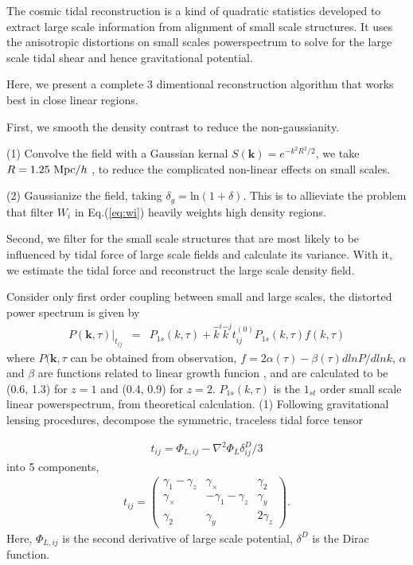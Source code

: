 The cosmic tidal reconstruction is a kind of quadratic statistics developed to extract large scale information from alignment of small scale structures.
It uses the anisotropic distortions on small scales powerspectrum to solve for the large scale tidal shear and hence gravitational potential.

Here, we present a complete 3 dimentional reconstruction algorithm that works best in close linear regions.

First, we smooth the density contrast to reduce the non-gaussianity.

(1) Convolve the field with a Gaussian kernal
$S(\bm{k})=e^{-k^2R^2/2}$, 
we take $R=1.25\ \mathrm{Mpc}/h$ \cite{2012:pen},
to reduce the complicated non-linear effects on small scales.

(2) Gaussianize the field, taking 
$\delta_g=\mathrm{ln}(1+\delta)$. 
This is to allieviate the problem that filter $W_i$ in Eq.(\ref{eq:wi}) heavily weights high density regions.


Second, we filter for the small scale structures that are most likely to be influenced by tidal force of large scale fields and calculate its variance. 
With it, we estimate the tidal force and reconstruct the large scale density field.

Consider only first order coupling between small and large scales,  
the distorted power spectrum \cite{2015:zhu} is given by
\begin{eqnarray}
\label{eq:powerdistort}
P(\bm{k},\tau)|_{t_{ij}}&=&P_{1s}(k,\tau)+
\hat{k}^i\hat{k}^jt_{ij}^{(0)}P_{1s}(k,\tau)f(k,\tau)
\end{eqnarray}
where $P(\bm{k},\tau$ can be obtained from observation, 
$f=2\alpha(\tau)-\beta(\tau)dlnP/dlnk$, 
$\alpha$ and $\beta$ are functions related to linear growth funcion \cite{2015:zhu}, 
and are calculated to be (0.6, 1.3) for $z=1$ and (0.4, 0.9) for $z=2$.
$P_{1s}(k,\tau)$ is the $1_{st}$ order small scale linear powerspectrum, 
from theoretical calculation.
(1) Following gravitational lensing procedures, decompose the symmetric, traceless tidal force tensor 

\begin{eqnarray}
\label{eq:tij}
t_{ij}=\Phi_{L,ij}-\nabla^2\Phi_L\delta^D_{ij}/3
\end{eqnarray}
into 5 components, 
\begin{eqnarray}
t_{ij}=\left( \begin{array}{ccc}
\gamma_{1}-\gamma_{z} & \gamma_{\times} & \gamma_{2}\\
\gamma_{\times} & -\gamma_{1}-\gamma_{z} & \gamma_{y}\\
\gamma_{2} & \gamma_{y} & 2\gamma_z
\end{array} \right).
\end{eqnarray}
Here, $\Phi_{L,ij}$ is the second derivative of large scale potential, 
$\delta^D$ is the Dirac function.


